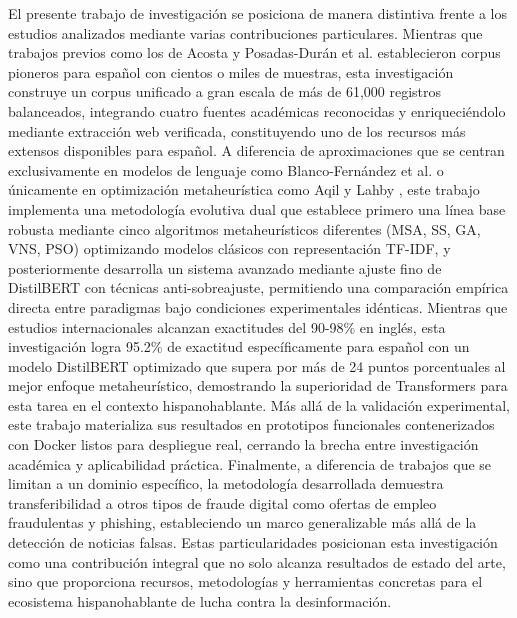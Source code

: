 El presente trabajo de investigación se posiciona de manera distintiva frente a los estudios analizados mediante varias contribuciones particulares. Mientras que trabajos previos como los de Acosta \cite{acosta2019construccion} y Posadas-Durán et al. \cite{posadas2019detection} establecieron corpus pioneros para español con cientos o miles de muestras, esta investigación construye un corpus unificado a gran escala de más de 61,000 registros balanceados, integrando cuatro fuentes académicas reconocidas y enriqueciéndolo mediante extracción web verificada, constituyendo uno de los recursos más extensos disponibles para español. A diferencia de aproximaciones que se centran exclusivamente en modelos de lenguaje como Blanco-Fernández et al. \cite{blanco2024enhancing} o únicamente en optimización metaheurística como Aqil y Lahby \cite{aqil2021modeling}, este trabajo implementa una metodología evolutiva dual que establece primero una línea base robusta mediante cinco algoritmos metaheurísticos diferentes (MSA, SS, GA, VNS, PSO) optimizando modelos clásicos con representación TF-IDF, y posteriormente desarrolla un sistema avanzado mediante ajuste fino de DistilBERT con técnicas anti-sobreajuste, permitiendo una comparación empírica directa entre paradigmas bajo condiciones experimentales idénticas. Mientras que estudios internacionales alcanzan exactitudes del 90-98\% en inglés, esta investigación logra 95.2\% de exactitud específicamente para español con un modelo DistilBERT optimizado que supera por más de 24 puntos porcentuales al mejor enfoque metaheurístico, demostrando la superioridad de Transformers para esta tarea en el contexto hispanohablante. Más allá de la validación experimental, este trabajo materializa sus resultados en prototipos funcionales contenerizados con Docker listos para despliegue real, cerrando la brecha entre investigación académica y aplicabilidad práctica. Finalmente, a diferencia de trabajos que se limitan a un dominio específico, la metodología desarrollada demuestra transferibilidad a otros tipos de fraude digital como ofertas de empleo fraudulentas y phishing, estableciendo un marco generalizable más allá de la detección de noticias falsas. Estas particularidades posicionan esta investigación como una contribución integral que no solo alcanza resultados de estado del arte, sino que proporciona recursos, metodologías y herramientas concretas para el ecosistema hispanohablante de lucha contra la desinformación.